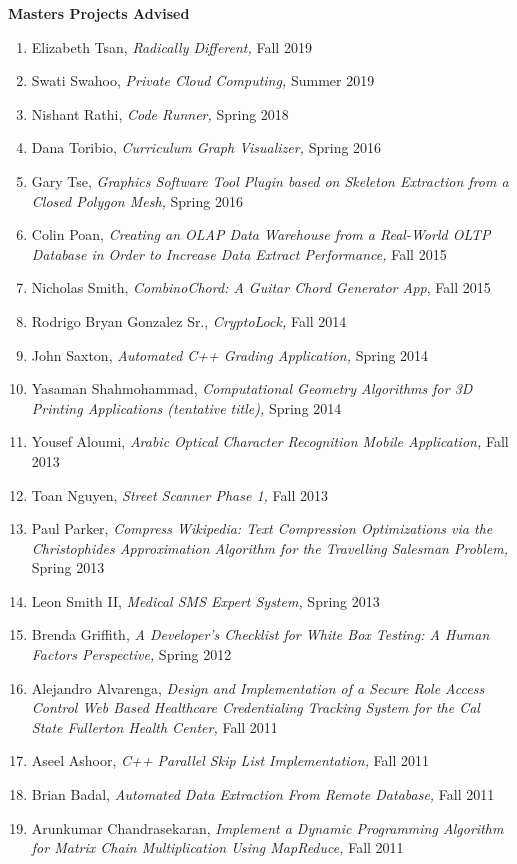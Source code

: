 \documentclass[11pt]{letter}
\begin{document}
\textbf{Masters Projects Advised}
\begin{enumerate}
  \item Elizabeth Tsan, \emph{Radically Different,} Fall 2019
  \item Swati Swahoo, \emph{Private Cloud Computing,} Summer 2019
  \item Nishant Rathi, \emph{Code Runner,} Spring 2018
\item Dana Toribio, \emph{Curriculum Graph Visualizer,} Spring 2016
\item Gary Tse, \emph{Graphics Software Tool Plugin based on Skeleton Extraction from a Closed Polygon Mesh,} Spring 2016
\item Colin Poan, \emph{Creating an OLAP Data Warehouse from a Real-World OLTP Database in Order to Increase Data Extract Performance,} Fall 2015
\item Nicholas Smith, \emph{CombinoChord: A Guitar Chord Generator App}, Fall 2015
\item Rodrigo Bryan Gonzalez Sr., \emph{CryptoLock,} Fall 2014
\item John Saxton, \emph{Automated C++ Grading Application,} Spring 2014
\item Yasaman Shahmohammad, \emph{Computational Geometry Algorithms for 3D Printing Applications (tentative title),} Spring 2014
\item Yousef Aloumi, \emph{Arabic Optical Character Recognition Mobile Application,} Fall 2013
\item Toan Nguyen, \emph{Street Scanner Phase 1,} Fall 2013
\item Paul Parker, \emph{Compress Wikipedia: Text Compression Optimizations via the Christophides Approximation Algorithm for the Travelling Salesman Problem,} Spring 2013
\item Leon Smith II, \emph{Medical SMS Expert System,} Spring 2013
\item Brenda Griffith, \emph{A Developer’s Checklist for White Box Testing: A Human Factors Perspective,} Spring 2012
\item Alejandro Alvarenga, \emph{Design and Implementation of a Secure Role Access Control Web Based Healthcare Credentialing Tracking System for the Cal State Fullerton Health Center,} Fall 2011
\item Aseel Ashoor, \emph{C++ Parallel Skip List Implementation,} Fall 2011
\item Brian Badal, \emph{Automated Data Extraction From Remote Database,} Fall 2011
\item Arunkumar Chandrasekaran, \emph{Implement a Dynamic Programming Algorithm for Matrix Chain Multiplication Using MapReduce,} Fall 2011

\end{enumerate}
\end{document}
